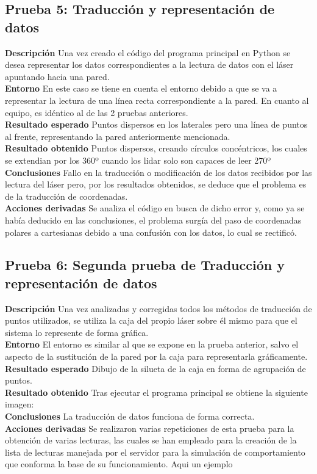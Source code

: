 \subsection{Prueba 5: Traducción y representación de datos}
\textbf{Descripción} Una vez creado el código del programa principal en Python se desea representar los datos correspondientes a la lectura de datos con el láser apuntando hacia una pared. \\
\textbf{Entorno} En este caso se tiene en cuenta el entorno debido a que se va a representar la lectura de una línea recta correspondiente a la pared. En cuanto al equipo, es idéntico al de las 2 pruebas anteriores.\\
\textbf{Resultado esperado} Puntos dispersos en los laterales pero una línea de puntos al frente, representando la pared anteriormente mencionada.\\
\textbf{Resultado obtenido} Puntos dispersos, creando círculos concéntricos, los cuales se extendian por los 360º cuando los lidar solo son capaces de leer 270º\\
\textbf{Conclusiones} Fallo en la traducción o modificación de los datos recibidos por las lectura del láser pero, por los resultados obtenidos, se deduce que el problema es de la traducción de coordenadas.\\
\textbf{Acciones derivadas}  Se analiza el código en busca de dicho error y, como ya se había deducido en las conclusiones, el problema surgía del paso de coordenadas polares a cartesianas debido a una confusión con los datos, lo cual se rectificó.

\subsection{Prueba 6: Segunda prueba de Traducción y representación de datos}
\textbf{Descripción} Una vez analizadas y corregidas todos los métodos de traducción de puntos utilizados, se utiliza la caja del propio láser sobre él mismo para que el sistema lo represente de forma gráfica.\\
\textbf{Entorno} El entorno es similar al que se expone en la prueba anterior, salvo el aspecto de la sustitución de la pared por la caja para representarla gráficamente.\\
\textbf{Resultado esperado} Dibujo de la silueta de la caja en forma de agrupación de puntos.\\
\textbf{Resultado obtenido} Tras ejecutar el programa principal se obtiene la siguiente imagen:\\
\textbf{Conclusiones} La traducción de datos funciona de forma correcta.\\
\textbf{Acciones derivadas}  Se realizaron varias repeticiones de esta prueba para la obtención de varias lecturas, las cuales se han empleado para la creación de la lista de lecturas manejada por el servidor para la simulación de comportamiento que conforma la base de su funcionamiento. Aqui un ejemplo
